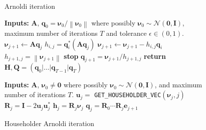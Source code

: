 \documentclass{article}
\newcommand{\norm}[1]{\left\lVert#1\right\rVert}
\newcommand{\mbf}[1]{{\boldsymbol{\mathbf{#1}}}}
\renewcommand{\bm}{\mbf}
\begin{document}
\begin{figure}[htbp]
  \begin{minipage}[t]{0.49\linewidth}
    \begin{algorithm}[H] \caption{ Arnoldi iteration } \label{alg:arnoldi}
      \begin{algorithmic}[1]
        \State \textbf{Inputs:} $\bm{A}$, $\bm{q}_{0} = \bm{\nu}_{0} / \norm{\bm{\nu}_{0}}$ where possibly $\bm{\nu}_{0} \sim \mathcal{N}\left(\bm{0}, \bm{I}\right)$,
        maximum number of iterations $T$ and tolerance $\epsilon \in \left(0,1\right)$.
        \vspace{0.03cm}
            \State $\bm{\nu}_{j+1} \leftarrow \bm{A} \bm{q}_{j}$
            \State $h_{i,j} = \bm{q}_{i}^{*} (\bm{A} \bm{q}_{j})$
            \State $\bm{\nu}_{j+1} \leftarrow \bm{\nu}_{j+1} - h_{i,j} \bm{q}_{i}$
            \EndFor
            \State $h_{j+1,j} = \norm{\bm{\nu}_{j+1}}$
            \vspace{0.05cm}
              \State \textbf{stop}
            \Else
              \State $\bm{q}_{j+1} = \bm{\nu}_{j+1} / h_{j+1,j}$
              \vspace{0.05cm}
            \EndIf
        \vspace{0.05cm}
        \EndFor
        \State \textbf{return} $\bm{H}, \bm{Q} = \left(\bm{q}_{0} | \dots | \bm{q}_{T-1} | \bm{q}_{T}\right)$
        \vspace{0.03cm}
      \end{algorithmic}
    \end{algorithm}
  \end{minipage}\hfill
  \begin{minipage}[t]{0.49\linewidth}
    \begin{algorithm}[H] \caption{ Householder Arnoldi iteration } \label{alg:arnoldi-house}
      \begin{algorithmic}[1]
        \State \textbf{Inputs:} $\bm{A}$, $\bm{\nu}_{0} \neq \bm{0}$ where possibly $\bm{\nu}_{0} \sim \mathcal{N}\left(\bm{0}, \bm{I}\right)$,
        and maximum number of iterations $T$.
        \vspace{0.03cm}
            \State $\bm{u}_{j} = $ \texttt{GET\_HOUSEHOLDER\_VEC}$(\bm{\nu}_{j}, j)$
            \State $\bm{R}_{j} = \bm{I} - 2 \bm{u}_{j} \bm{u}_{j}^{*}$
            \State $\bm{h}_{j} = \bm{R}_{j} \bm{\nu}_{j}$
            \State $\bm{q}_{j} = \bm{R}_{0} \cdots \bm{R}_{j} \bm{e}_{j+1}$

\end{algorithmic}
\end{algorithm}
\end{minipage}
\end{figure}
\end{document}
